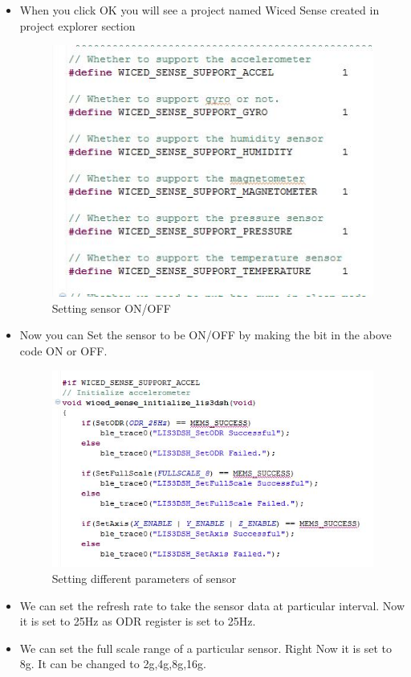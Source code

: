 \documentclass[11pt,a4paper]{article}
\begin{document}
\begin{itemize}
	\item When you click OK you will see a project named Wiced Sense created in project explorer section
		
    \newpage
	 \begin{figure}[h]
    \centering
	\includegraphics[scale=0.6]{support.JPG}
	\caption{Setting sensor ON/OFF}
	\end{figure}
	\item Now you can Set the sensor to be ON/OFF by making the bit in the above code ON or OFF.
	
	 \begin{figure}[h]
    \centering
	\includegraphics[scale=0.6]{wiced_accel.JPG}
	\caption{Setting different parameters of sensor}
	\end{figure}
	
	\item We can set the refresh rate to take the sensor data at particular interval. Now it is set to 25Hz as ODR register is set to 25Hz.
	\item We can set the full scale range of a particular sensor. Right Now it is set to 8g. It can be changed to 2g,4g,8g,16g.


\end{itemize}
\end{document}
